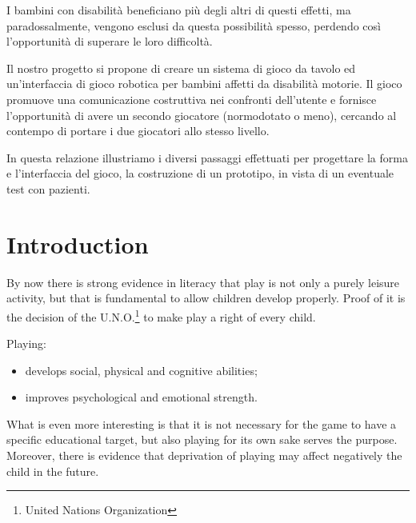 \documentclass[a4paper,twoside]{book}
\begin{document}
I bambini con disabilit\`{a} beneficiano pi\`{u} degli altri di questi effetti, ma paradossalmente, vengono esclusi da questa possibilit\`{a} spesso, perdendo cos\`{i} l'opportunit\`{a} di superare le loro difficolt\`{a}.

Il nostro progetto si propone di creare un sistema di gioco da tavolo ed un'interfaccia di gioco robotica per bambini affetti da disabilit\`{a} motorie. Il gioco promuove una comunicazione costruttiva nei confronti dell'utente e fornisce l'opportunit\`{a} di avere un secondo giocatore (normodotato o meno), cercando al contempo di portare i due giocatori allo stesso livello.

In questa relazione illustriamo i diversi passaggi effettuati per progettare la forma e l'interfaccia del gioco, la costruzione di un prototipo, in vista di un eventuale test con pazienti.
 
\chapter{Introduction}

By now there is strong evidence in literacy that play is not only a purely leisure activity, but that is fundamental to allow children develop properly. Proof of it is the decision of the U.N.O.\footnote{United Nations Organization} to make play a right of every child. 

\beforelist Playing:
\begin{itemize}
\item develops social, physical and cognitive abilities;
\item  improves psychological and emotional strength.
\end{itemize}
\afterlist*
What is even more interesting is that it is not necessary for the game to have a specific educational target, but also playing for its own sake serves the purpose. Moreover, there is evidence that  deprivation of playing may affect negatively the child in the future.
\end{document}
